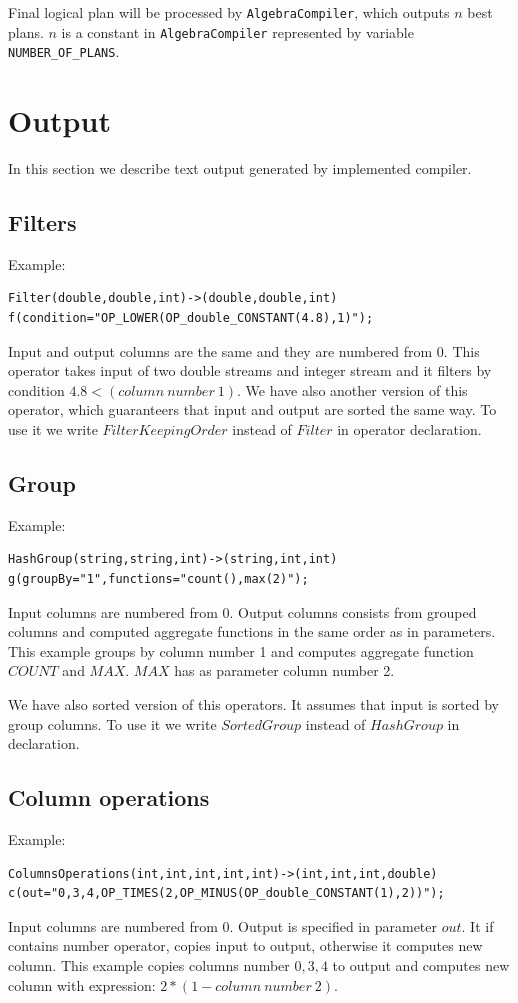 Final logical plan will be processed by \texttt{AlgebraCompiler}, which outputs $n$ best plans. $n$ is a constant in  \texttt{AlgebraCompiler} represented by variable \texttt{NUM\-BER\_\-OF\_\-PLANS}. 

\section{Output}

In this section we describe text output generated by implemented compiler.

\subsection{Filters}
Example: 
\begin{lstlisting}
Filter(double,double,int)->(double,double,int)
f(condition="OP_LOWER(OP_double_CONSTANT(4.8),1)"); 
\end{lstlisting}

Input and output columns are the same and they are numbered from 0.
This operator takes input of two double streams and integer stream and it filters by condition $4.8<(column~number~1)$. We have also another version of this operator, which guaranteers that input and output are sorted the same way. To use it we write $FilterKeepingOrder$ instead of $Filter$ in operator declaration. 

\subsection{Group}
Example: 
\begin{lstlisting}
HashGroup(string,string,int)->(string,int,int)
g(groupBy="1",functions="count(),max(2)");
\end{lstlisting}
Input columns are numbered from 0. Output columns consists from grouped columns and computed aggregate functions in the same order as in parameters. 
This example groups by column number 1 and computes aggregate function $COUNT$ and $MAX$. $MAX$ has as parameter column number 2. 

We have also sorted version of this operators. It assumes that input is sorted by group columns. To use it we write $SortedGroup$ instead of $HashGroup$ in declaration.

\subsection{Column operations}
Example: 
\begin{lstlisting} 
ColumnsOperations(int,int,int,int,int)->(int,int,int,double)
c(out="0,3,4,OP_TIMES(2,OP_MINUS(OP_double_CONSTANT(1),2))"); 
\end{lstlisting}
Input columns are numbered from 0. Output is specified in parameter $out$. It if contains number operator, copies input to output, otherwise it computes new column. 
This example copies columns number $0,3,4$ to output and computes new column with expression: $2*(1-column~number~2)$.

